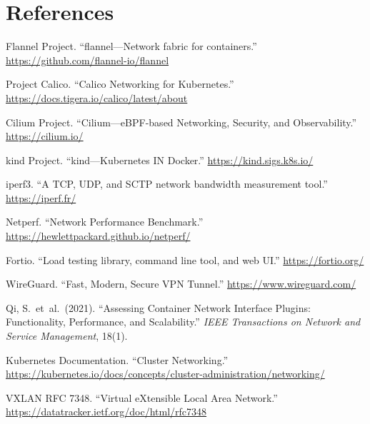 \documentclass[11pt,a4paper]{article}
\begin{document}
\section*{References}

\begin{enumerate}[label={[\arabic*]}]
  \item Flannel Project. ``flannel---Network fabric for containers.'' \url{https://github.com/flannel-io/flannel}
  \item Project Calico. ``Calico Networking for Kubernetes.'' \url{https://docs.tigera.io/calico/latest/about}
  \item Cilium Project. ``Cilium---eBPF-based Networking, Security, and Observability.'' \url{https://cilium.io/}
  \item kind Project. ``kind---Kubernetes IN Docker.'' \url{https://kind.sigs.k8s.io/}
  \item iperf3. ``A TCP, UDP, and SCTP network bandwidth measurement tool.'' \url{https://iperf.fr/}
  \item Netperf. ``Network Performance Benchmark.'' \url{https://hewlettpackard.github.io/netperf/}
  \item Fortio. ``Load testing library, command line tool, and web UI.'' \url{https://fortio.org/}
  \item WireGuard. ``Fast, Modern, Secure VPN Tunnel.'' \url{https://www.wireguard.com/}
  \item Qi, S.\ et~al.\ (2021). ``Assessing Container Network Interface Plugins: Functionality, Performance, and Scalability.'' \textit{IEEE Transactions on Network and Service Management}, 18(1).
  \item Kubernetes Documentation. ``Cluster Networking.'' \url{https://kubernetes.io/docs/concepts/cluster-administration/networking/}
  \item VXLAN RFC 7348. ``Virtual eXtensible Local Area Network.'' \url{https://datatracker.ietf.org/doc/html/rfc7348}
\end{enumerate}
\end{document}
